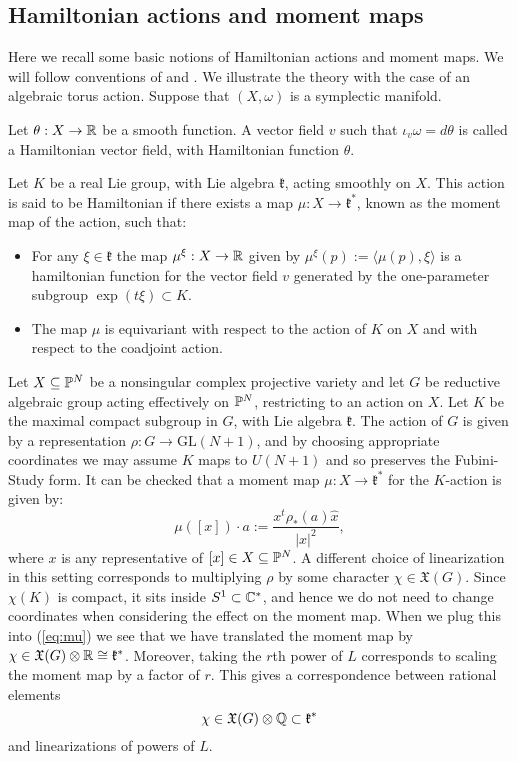 \subsection{Hamiltonian actions and moment maps} \label{basics:momentmaps}
Here we recall some basic notions of Hamiltonian actions and moment maps. We will follow conventions of \cite{da2006symplectic} and \cite{berman2014complex}. We illustrate the theory with the case of an algebraic torus action. Suppose that \((X,\omega)\) is a symplectic manifold.
\begin{definition}
Let \(\theta: X \to \mathbb{R}\) be a smooth function. A vector field \(v\) such that  \(\iota_v \omega = d \theta\) is called a Hamiltonian vector field, with Hamiltonian function \(\theta\). 
\end{definition}
\begin{definition}
Let \(K\) be a real Lie group, with Lie algebra \(\mathfrak{k}\), acting smoothly on \(X\). This action is said to be Hamiltonian if there exists a map \(\mu: X \to \mathfrak{k}^*\), known as the moment map of the action, such that:
\begin{itemize}
\item For any \(\xi \in \mathfrak{k}\) the map \(\mu^\xi : X \to \mathbb{R}\) given by \(\mu^\xi(p) := \langle \mu(p), \xi \rangle \) is a hamiltonian function for the vector field \(v\) generated by the one-parameter subgroup \(\exp(t \xi) \subset K\).
\item The map \(\mu\) is equivariant with respect to the action of \(K\) on \(X\) and with respect to the coadjoint action.
\end{itemize}
\end{definition}
\begin{example}
Let \(X \subseteq \mathbb{P}^N\) be a nonsingular complex projective variety and let \(G\) be reductive algebraic group acting effectively on \(\mathbb{P}^N\), restricting to an action on \(X\). Let \(K\) be the maximal compact subgroup in \(G\), with Lie algebra \(\mathfrak{k}\). The action of \(G\) is given by a representation \(\rho: G \to \text{GL}(N+1)\), and by choosing appropriate coordinates we may assume \(K\) maps to \(U(N+1)\) and so preserves the Fubini-Study form. It can be checked that a moment map \(\mu: X \to \mathfrak{k}^*\) for the \(K\)-action is given by:
\begin{equation}\label{eq:mu}
\mu([x]) \cdot a := \frac{x^t \rho_*(a) \hat{x}}{ |x|^2},
\end{equation}
where \(x\) is any representative of \([x] \in X \subseteq \mathbb{P}^N\). A different choice of linearization in this setting corresponds to multiplying \(\rho\) by some character \(\chi \in \mathfrak{X}(G)\). Since \(\chi(K)\) is compact, it sits inside \(S^1 \subset \mathbb{C}^*\), and hence we do not need to change coordinates when considering the effect on the moment map. When we plug this into (\ref{eq:mu}) we see that we have translated the moment map by \(\chi \in \mathfrak{X}(G) \otimes \mathbb{R} \cong \mathfrak{k}^*\). Moreover, taking the \(r\)th power of \(L\) corresponds to scaling the moment map by a factor of \(r\). This gives a correspondence between rational elements
\[
\chi \in \mathfrak{X}(G) \otimes \mathbb{Q} \subset \mathfrak{k}^*
\]
and linearizations of powers of \(L\).
\end{example}
